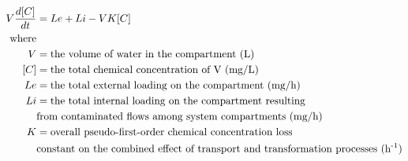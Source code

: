 \documentclass[fleqn, oneside, 11pt]{article}%
\begin{document}
\begin{preview}
\begin{align*}%
V \frac{d[C]}{dt} & = Le + Li -VK[C] \nonumber \\ 
\text{where} \nonumber \\
V & =  \text{the volume of water in the compartment (L)} \nonumber \\
[C] & =  \text{the total chemical concentration of V (mg/L)} \nonumber \\
Le & =  \text{the total external loading on the compartment (mg/h)} \nonumber \\
Li & =  \text{the total internal loading on the compartment resulting}\nonumber \\
& \text{from contaminated flows among system compartments (mg/h)} \nonumber \\
K & =  \text{overall pseudo-first-order chemical concentration loss} \nonumber \\
& \text{constant on the combined effect of transport and transformation processes (h\textsuperscript{-1})} \nonumber \\
\end{align*} 
\end{preview}
\end{document}
